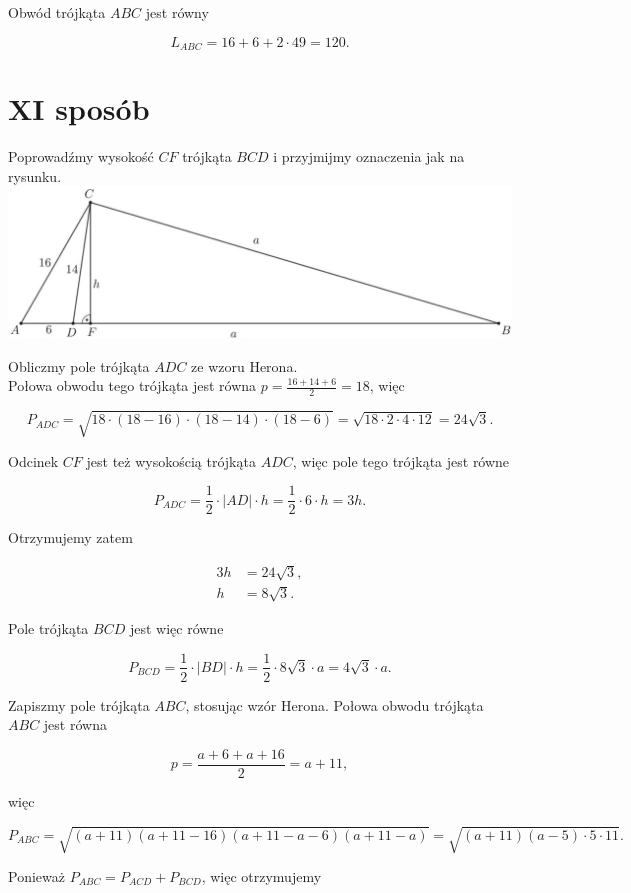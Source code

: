 \documentclass[10pt]{article}
\begin{document}
Obwód trójkąta $A B C$ jest równy

$$
L_{A B C}=16+6+2 \cdot 49=120 .
$$

\section*{XI sposób}
Poprowadźmy wysokość $C F$ trójkąta $B C D$ i przyjmijmy oznaczenia jak na rysunku.\\
\includegraphics[max width=\textwidth, center]{2025_02_07_d712b9a47aa2c64928dbg-32(1)}

Obliczmy pole trójkąta $A D C$ ze wzoru Herona.\\
Połowa obwodu tego trójkąta jest równa $p=\frac{16+14+6}{2}=18$, więc

$$
P_{A D C}=\sqrt{18 \cdot(18-16) \cdot(18-14) \cdot(18-6)}=\sqrt{18 \cdot 2 \cdot 4 \cdot 12}=24 \sqrt{3} .
$$

Odcinek $C F$ jest też wysokością trójkąta $A D C$, więc pole tego trójkąta jest równe

$$
P_{A D C}=\frac{1}{2} \cdot|A D| \cdot h=\frac{1}{2} \cdot 6 \cdot h=3 h .
$$

Otrzymujemy zatem

$$
\begin{aligned}
3 h & =24 \sqrt{3}, \\
h & =8 \sqrt{3} .
\end{aligned}
$$

Pole trójkąta $B C D$ jest więc równe

$$
P_{B C D}=\frac{1}{2} \cdot|B D| \cdot h=\frac{1}{2} \cdot 8 \sqrt{3} \cdot a=4 \sqrt{3} \cdot a .
$$

Zapiszmy pole trójkąta $A B C$, stosując wzór Herona. Połowa obwodu trójkąta $A B C$ jest równa

$$
p=\frac{a+6+a+16}{2}=a+11,
$$

więc

$$
P_{A B C}=\sqrt{(a+11)(a+11-16)(a+11-a-6)(a+11-a)}=\sqrt{(a+11)(a-5) \cdot 5 \cdot 11} .
$$

Ponieważ $P_{A B C}=P_{A C D}+P_{B C D}$, więc otrzymujemy
\end{document}
